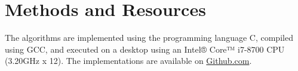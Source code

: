 \chapter{Methods and Resources}


The algorithms are implemented using the programming language C, compiled using GCC, and executed on a desktop using an Intel® Core™ i7-8700 CPU (3.20GHz x 12).
The implementations are available on \href{https://github.com/ThompsonA93/C-Slurm-Benchmark}{Github.com}.